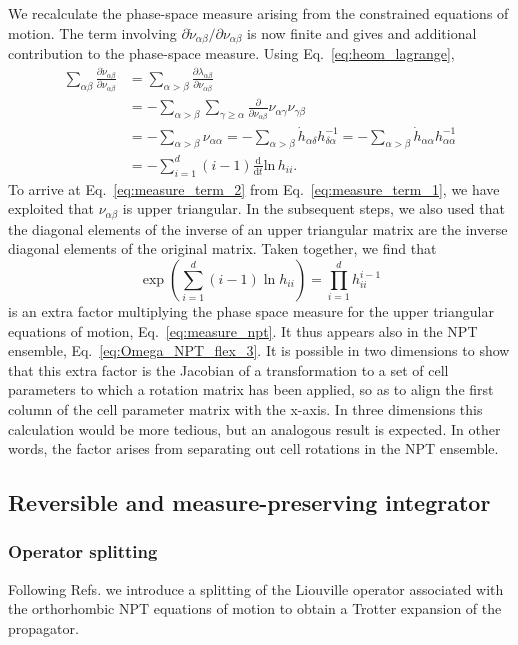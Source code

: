 \documentclass[12pt,letter]{article}
\begin{document}
We recalculate the phase-space measure arising from the constrained equations of motion.
The term involving $\partial \dot{\nu}_{\alpha\beta}/\partial \nu_{\alpha\beta}$ is now finite and gives
and additional contribution to the phase-space measure. Using Eq.~\eqref{eq:heom_lagrange},
\begin{align}
\sum_{\alpha\beta} \frac{\partial \dot{\nu}_{\alpha\beta}}{\partial\nu_{\alpha\beta}} &= \sum_{\alpha>\beta} \frac{\partial \lambda_{\alpha\beta}}{\partial \nu_{\alpha\beta}}\\
&= - \sum_{\alpha > \beta} \sum_{\gamma \ge \alpha} \frac{\partial}{\partial\nu_{\alpha\beta}} \nu_{\alpha\gamma}\nu_{\gamma\beta}\label{eq:measure_term_1}\\
&=- \sum_{\alpha>\beta} \nu_{\alpha\alpha}
= -\sum_{\alpha>\beta} \dot{h}_{\alpha\delta}h^{-1}_{\delta\alpha} 
=-\sum_{\alpha>\beta} \dot{h}_{\alpha\alpha}h^{-1}_{\alpha\alpha} \label{eq:measure_term_2}\\
&= - \sum_{i=1}^d (i -1) \frac{\mathrm{d}}{\mathrm{d}t} \mathrm{ln}\, h_{ii}.
\end{align}
To arrive at Eq.~\eqref{eq:measure_term_2} from Eq.~\eqref{eq:measure_term_1}, we have
exploited that $\nu_{\alpha\beta}$ is upper triangular. In the subsequent steps, we also used that
the diagonal elements of the inverse of an upper triangular matrix are the inverse diagonal elements
of the original matrix. Taken together, we find that 
\begin{equation}
\exp\left(\sum_{i=1}^d (i-1) \ln h_{ii}\right) = \prod_{i=1}^d h_{ii}^{i-1}
\label{eq:measure_fac_extra}
\end{equation}
is an extra factor multiplying the phase space measure for the upper triangular equations
of motion, Eq.~\eqref{eq:measure_npt}. It thus appears also in the NPT ensemble, Eq.~\eqref{eq:Omega_NPT_flex_3}. It is possible in two dimensions to show that this extra factor
is the Jacobian of a transformation to a set of cell parameters to which a
rotation matrix has been applied, so as to align the first column of the cell parameter matrix
with the x-axis. In three dimensions this calculation would be more tedious, but an analogous
result is expected. In other words, the factor arises from separating out cell rotations in the NPT ensemble.

\subsection{Reversible and measure-preserving integrator}
\subsubsection{Operator splitting}
Following Refs. \cite{Martyna1994,Martyna1996, Tuckerman2006,Yu2010}
we introduce a splitting of the Liouville operator associated with the
orthorhombic NPT equations of motion to obtain a Trotter expansion
of the propagator.
\end{document}
